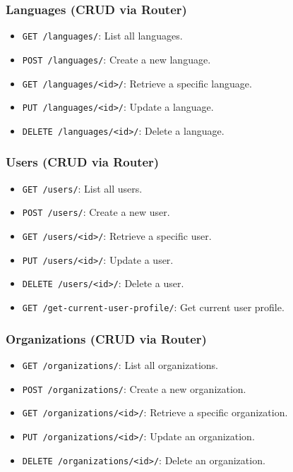 \documentclass[11pt]{article}
\begin{document}
\subsubsection{Languages (CRUD via Router)}
\begin{itemize}[leftmargin=*]
  \item \verb|GET /languages/|: List all languages.
  \item \verb|POST /languages/|: Create a new language.
  \item \verb|GET /languages/<id>/|: Retrieve a specific language.
  \item \verb|PUT /languages/<id>/|: Update a language.
  \item \verb|DELETE /languages/<id>/|: Delete a language.
\end{itemize}

\subsubsection{Users (CRUD via Router)}
\begin{itemize}[leftmargin=*]
  \item \verb|GET /users/|: List all users.
  \item \verb|POST /users/|: Create a new user.
  \item \verb|GET /users/<id>/|: Retrieve a specific user.
  \item \verb|PUT /users/<id>/|: Update a user.
  \item \verb|DELETE /users/<id>/|: Delete a user.
  \item \verb|GET /get-current-user-profile/|: Get current user profile.
\end{itemize}

\subsubsection{Organizations (CRUD via Router)}
\begin{itemize}[leftmargin=*]
  \item \verb|GET /organizations/|: List all organizations.
  \item \verb|POST /organizations/|: Create a new organization.
  \item \verb|GET /organizations/<id>/|: Retrieve a specific organization.
  \item \verb|PUT /organizations/<id>/|: Update an organization.
  \item \verb|DELETE /organizations/<id>/|: Delete an organization.
\end{itemize}
\end{document}
